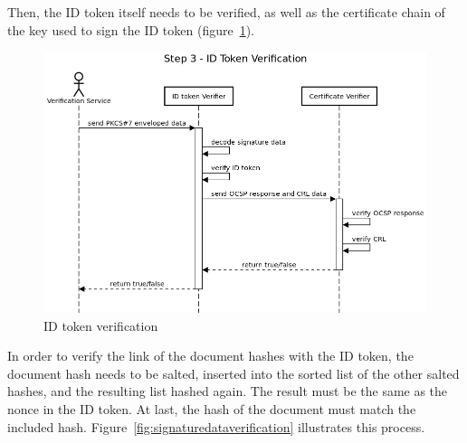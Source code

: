 Then, the ID token itself needs to be verified,
as well as the certificate chain of the key used to sign the ID token (figure~\ref{fig:idtokenverification}).

\begin{figure}
	\begin{center}
		\includegraphics[scale=0.5]{images/protocol_verification_step3_id_token.png}
		\caption{ID token verification}
		\label{fig:idtokenverification}
	\end{center}
\end{figure}

In order to verify the link of the document hashes with the ID token,
the document hash needs to be salted, inserted into the sorted list of the other salted hashes,
and the resulting list hashed again.
The result must be the same as the nonce in the ID token.
At last, the hash of the document must match the included hash.
Figure~\ref{fig:signaturedataverification} illustrates this process.

